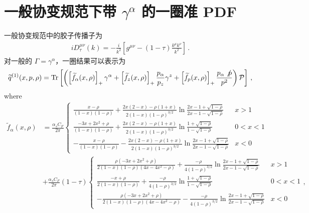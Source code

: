 \section{一般协变规范下带 $\gamma^\alpha$ 的一圈准 PDF}\label{app:one-loop}
一般协变规范中的胶子传播子为
\begin{align}
iD_\tau^{\mu\nu}(k)=-\frac{i}{k^2}\left[g^{\mu\nu}-(1-\tau)\frac{k^\mu k^\nu}{k^2}\right]\,.
\end{align}
对一般的 $\Gamma=\gamma^\alpha$，一圈结果可以表示为
\begin{align}
\widetilde{q}^{(1)}(x,p,\rho)=\mbox{Tr}\left[\left(\left[\widetilde{f}_\alpha(x,\rho)\right]_+\gamma^\alpha+\left[\widetilde{f}_z(x,\rho)\right]_+\frac{p_\alpha}{p_z}\gamma^z+\left[\widetilde{f}_p(x,\rho)\right]_+\frac{p_\alpha\slashed{p}}{p^2}\right){\cal P}\right]\,,
\end{align}
where
\begin{align}
\widetilde{f}_\alpha(x,\rho)&=\frac{\alpha_s C_F}{2\pi}\left\{
\begin{array}{lc}
\frac{x-\rho}{(1-x)(1-\rho)}+\frac{2x(2-x)-\rho(1+x)}{2(1-x)(1-\rho)^{3/2}}\ln\frac{2x-1+\sqrt{1-\rho}}{2x-1-\sqrt{1-\rho}} & x>1\\
\frac{-3x+2x^2+\rho}{(1-x)(1-\rho)}+\frac{2x(2-x)-\rho(1+x)}{2(1-x)(1-\rho)^{3/2}}\ln\frac{1+\sqrt{1-\rho}}{1-\sqrt{1-\rho}} & 0<x<1\\
-\frac{x-\rho}{(1-x)(1-\rho)}-\frac{2x(2-x)-\rho(1+x)}{2(1-x)(1-\rho)^{3/2}}\ln\frac{2x-1+\sqrt{1-\rho}}{2x-1-\sqrt{1-\rho}} & x<0
\end{array}\right.\nonumber\\
&+\frac{\alpha_s C_F}{2\pi}(1-\tau)\left\{
\begin{array}{lc}
\frac{\rho(-3x+2x^2+\rho)}{2(1-x)(1-\rho)(4x-4x^2-\rho)}+\frac{-\rho}{4(1-\rho)^{3/2}}\ln\frac{2x-1+\sqrt{1-\rho}}{2x-1-\sqrt{1-\rho}} & x>1\\
\frac{-x+\rho}{2(1-x)(1-\rho)}+\frac{-\rho}{4(1-\rho)^{3/2}}\ln\frac{1+\sqrt{1-\rho}}{1-\sqrt{1-\rho}} & 0<x<1\\
-\frac{\rho(-3x+2x^2+\rho)}{2(1-x)(1-\rho)(4x-4x^2-\rho)}-\frac{-\rho}{4(1-\rho)^{3/2}}\ln\frac{2x-1+\sqrt{1-\rho}}{2x-1-\sqrt{1-\rho}} & x<0
\end{array}\right.,
\end{align}
